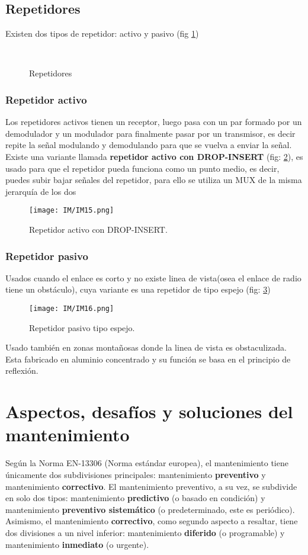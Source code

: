 \documentclass[
	12pt, %
	fleqn, %
	a4paper, %
	oneside, %
]{LegrandOrangeBook}
\begin{document}
\section{Repetidores}
Existen dos tipos de repetidor: activo y pasivo (fig \ref{fig:tipos de repetidor})
\begin{figure}[H]
\centering
{}\\
\caption{Repetidores}
\label{fig:tipos de repetidor}
\end{figure}
\subsection{Repetidor activo}\label{Repetidor activo}
Los repetidores activos tienen un receptor, luego pasa con un par formado por un demodulador y un modulador para finalmente pasar por un transmisor, es decir repite la señal modulando y demodulando para que se vuelva a enviar la señal. Existe una variante llamada \textbf{repetidor activo con DROP-INSERT} (fig: \ref{fig:repetidor dropinsert}), es usado para que el repetidor pueda funciona como un punto medio, es decir, puedes subir bajar señales del repetidor, para ello se utiliza un MUX de la misma jerarquía de los dos
\begin{figure}[]
\centering
\texttt{[image: IM/IM15.png]}
\caption{Repetidor activo con DROP-INSERT.}
\label{fig:repetidor dropinsert}
\end{figure}
\subsection{Repetidor pasivo}
Usados cuando el enlace es corto y no existe linea de vista(osea el enlace de radio tiene un obstáculo), cuya variante es una repetidor de tipo espejo (fig: \ref{fig:repetidor pasivo espejo})
\begin{figure}[]
\centering
\texttt{[image: IM/IM16.png]}
\caption{Repetidor pasivo tipo espejo.}
\label{fig:repetidor pasivo espejo}
\end{figure}
Usado también en zonas montañosas donde la linea de vista es obstaculizada. Esta fabricado en aluminio concentrado y su función se basa en el principio de reflexión.
\chapter{Aspectos, desafíos y soluciones del mantenimiento}
Según la Norma EN-13306 (Norma estándar europea), el mantenimiento tiene únicamente dos subdivisiones principales: mantenimiento \textbf{preventivo} y mantenimiento \textbf{correctivo}. El mantenimiento preventivo, a su vez, se subdivide en solo dos tipos: mantenimiento \textbf{predictivo} (o basado en condición) y mantenimiento \textbf{preventivo sistemático} (o predeterminado, este es periódico).\\
Asimismo, el mantenimiento \textbf{correctivo}, como segundo aspecto a resaltar, tiene dos divisiones a un nivel inferior: mantenimiento \textbf{diferido} (o programable) y mantenimiento \textbf{inmediato} (o urgente).
\end{document}
